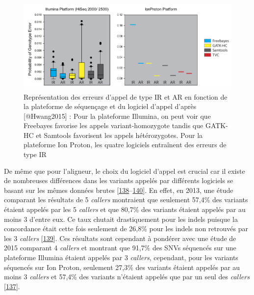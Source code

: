 \documentclass[12pt,twoside]{ugathesis}
\theoremstyle{definition}
\theoremstyle{definition}
\theoremstyle{remark}
\begin{document}
\begin{figure}

{\centering \includegraphics[scale=.37]{figure/snp_error_type} 

}

\caption[Représentation des erreurs d'appel de type IR et AR en fonction de la plateforme de séquençage et du logiciel d'appel]{Représentation des erreurs d'appel de type IR et AR en fonction de la plateforme de séquençage et du logiciel d'appel d'après [@Hwang2015] : Pour la plateforme Illumina, on peut voir que Freebayes favorise les appels variant-homozygote tandis que GATK-HC et Samtools favorisent les appels hétérozygotes. Pour la plateforme Ion Proton, les quatre logiciels entraînent des erreurs de type IR}\label{fig:snperror}
\end{figure}

De même que pour l'aligneur, le choix du logiciel d'appel est crucial
car il existe de nombreuses différences dans les variants appelés par
différents logiciels se basant sur les mêmes données brutes
{[}\protect\hyperlink{ref-Baes2014}{138}--\protect\hyperlink{ref-Rosenfeld2012}{140}{]}.
En effet, en 2013, une étude comparant les résultats de 5 \emph{callers}
montraient que seulement 57,4\% des variants étaient appelés par les 5
\emph{callers} et que 80,7\% des variants étaient appelés par au moins 3
d'entre eux. Ce taux chutait drastiquement pour les indels puisque la
concordance était cette fois seulement de 26,8\% pour les indels non
retrouvés par les 3 \emph{callers}
{[}\protect\hyperlink{ref-ORawe2013}{139}{]}. Ces résultats sont
cependant à pondérer avec une étude de 2015 comparant 4 \emph{callers}
et montrant que 91,7\% des SNVs séquencés sur une plateforme Illumina
étaient appelés par 3 \emph{callers}, cependant, pour les variants
séquencés sur Ion Proton, seulement 27,3\% des variants étaient appelés
par au moins 3 \emph{callers} et 57,4\% des variants n'étaient appelés
que par un seul des \emph{callers}
{[}\protect\hyperlink{ref-Hwang2015}{137}{]}.
\end{document}
